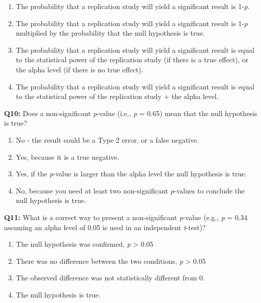 \documentclass[
]{krantz}
\providecommand{\tightlist}{%
  \setlength{\itemsep}{0pt}\setlength{\parskip}{0pt}}
\begin{document}
\begin{enumerate}
\def\labelenumi{\Alph{enumi})}
\tightlist
\item
  The probability that a replication study will yield a significant result is 1-\emph{p}.
\item
  The probability that a replication study will yield a significant result is 1-\emph{p} multiplied by the probability that the null hypothesis is true.
\item
  The probability that a replication study will yield a significant result is equal to the statistical power of the replication study (if there is a true effect), or the alpha level (if there is no true effect).
\item
  The probability that a replication study will yield a significant result is equal to the statistical power of the replication study + the alpha level.
\end{enumerate}

\textbf{Q10:} Does a non-significant \emph{p}-value (i.e., \emph{p} = 0.65) mean that the null hypothesis is true?

\begin{enumerate}
\def\labelenumi{\Alph{enumi})}
\tightlist
\item
  No - the result could be a Type 2 error, or a false negative.
\item
  Yes, because it is a true negative.
\item
  Yes, if the \emph{p}-value is larger than the alpha level the null hypothesis is true.
\item
  No, because you need at least two non-significant \emph{p}-values to conclude the null hypothesis is true.
\end{enumerate}

\textbf{Q11:} What is a correct way to present a non-significant \emph{p}-value (e.g., \emph{p} = 0.34 assuming an alpha level of 0.05 is used in an independent \emph{t}-test)?

\begin{enumerate}
\def\labelenumi{\Alph{enumi})}
\tightlist
\item
  The null hypothesis was confirmed, \emph{p} \textgreater{} 0.05
\item
  There was no difference between the two conditions, \emph{p} \textgreater{} 0.05
\item
  The observed difference was not statistically different from 0.
\item
  The null hypothesis is true.
\end{enumerate}
\end{document}
